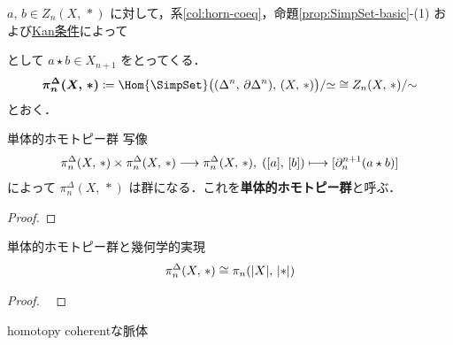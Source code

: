 \documentclass[TQFT_main]{subfiles}
\begin{document}
$a,\, b \in Z_n (X,\, *)$ に対して，系\ref{col:horn-coeq}，命題\ref{prop:SimpSet-basic}-(1) および\hyperref[def:infinity-1]{Kan条件}によって
\begin{center}
\end{center}
として $a \star b \in X_{n+1}$ をとってくる．
\begin{align}
    \bm{\pi^\Delta_n (X,\, *)} \coloneqq \Hom{\SimpSet} \bigl( (\Delta^n,\, \partial\Delta^n),\, (X,\, *) \bigr) / {\simeq} \cong Z_n (X,\, *) /{\sim}
\end{align}
とおく．

\begin{myprop}[label=def:simpi]{単体的ホモトピー群}
    写像
    \begin{align}
        \pi^\Delta_n (X,\, *) \times \pi^\Delta_n (X,\, *) \longrightarrow \pi^\Delta_n (X,\, *),\; ([a],\, [b]) \longmapsto [\partial^{n+1}_n (a \star b)]
    \end{align}
    によって $\pi^\Delta_n (X,\, *)$ は群になる．これを\textbf{単体的ホモトピー群}と呼ぶ．
\end{myprop}

\begin{proof}
    
\end{proof}

\begin{mytheo}[label=thm:homotopygrp]{単体的ホモトピー群と幾何学的実現}
    \begin{align}
        \pi^\Delta_n (X,\, *) \cong \pi_n (\abs{X},\, \abs{*})
    \end{align}
\end{mytheo}

\begin{proof}
    ~\cite[p.64, PROPOSITION 11.1]{goerss2009simplicial}
\end{proof}





\begin{mydef}[label=def:nerve-hc]{homotopy coherentな脈体}
    
\end{mydef}
\end{document}
